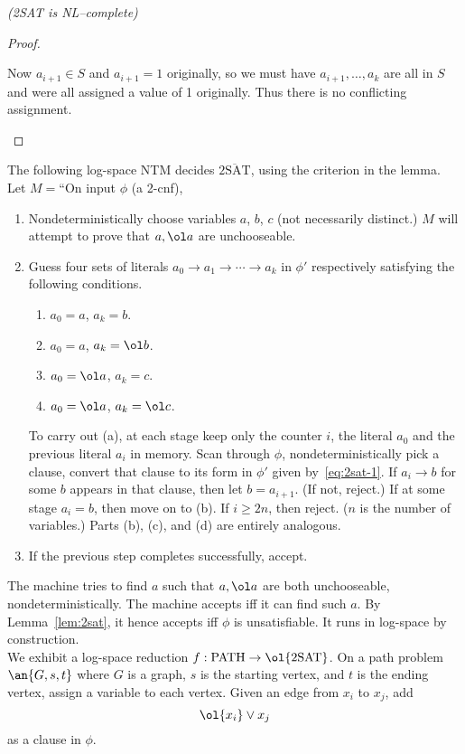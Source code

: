 \begin{problem}{\it(2SAT is NL--complete)}
\begin{proof}
\begin{enumerate}
Now $a_{i+1}\in S$ and $a_{i+1}=1$ originally, so we must have $a_{i+1},\ldots, a_k$ are all in $S$ and were all assigned a value of 1 originally. Thus there is no conflicting assignment.
\end{enumerate}
\end{proof}
The following log-space NTM decides $\overline{\text{2SAT}}$, using the criterion in the lemma. Let $M=$``On input $\phi$ (a 2-cnf),
\begin{enumerate}
\item
Nondeterministically choose variables $a$, $b$, $c$ (not necessarily distinct.) $M$ will attempt to prove that $a, \ol a$ are unchooseable.
\item
Guess four sets of literals $a_0\to a_1\to \cdots\to  a_k$ in $\phi'$  respectively satisfying the following conditions.
\begin{enumerate}
\item
$a_0=a$, $a_k=b$.
\item
$a_0=a$, $a_k=\ol b$.
\item
$a_0=\ol a$, $a_k=c$.
\item
$a_0=\ol a$, $a_k=\ol c$.
\end{enumerate}
To carry out (a), at each stage keep only the counter $i$, the literal $a_0$ and the previous literal $a_i$ in memory. Scan through $\phi$, nondeterministically pick a clause, convert that clause to its form in $\phi'$ given by~\eqref{eq:2sat-1}. If $a_i\to b$ for some $b$ appears in that clause, then let $b=a_{i+1}$. (If not, reject.) If at some stage $a_i=b$, then move on to (b). If $i\ge 2n$, then reject. ($n$ is the number of variables.) Parts (b), (c), and (d) are entirely analogous.
\item
If the previous step completes successfully, accept.
\end{enumerate}
The machine tries to find $a$ such that $a,\ol a$ are both unchooseable, nondeterministically. The machine accepts iff it can find such $a$. By Lemma~\ref{lem:2sat}, it hence accepts iff $\phi$ is unsatisfiable. It runs in log-space by construction.\\

We exhibit a log-space reduction $f: \text{PATH}\to \ol{\text{2SAT}}$. On a path problem $\an{G,s,t}$ where $G$ is a graph, $s$ is the starting vertex, and $t$ is the ending vertex, assign a variable to each vertex. Given an edge from $x_i$ to $x_j$, add
\[
\ol{x_i}\vee x_j
\]
as a clause in $\phi$. %


\end{problem}
